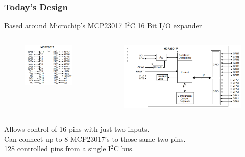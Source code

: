 \documentclass[t]{beamer}
\begin{document}
\begin{frame}
\frametitle{Today's Design}
Based around Microchip's MCP23017 I$^2$C 16 Bit I/O expander

\begin{columns}[c]
	\begin{figure}
		\includegraphics[width=1\linewidth]{mcp23071pinout.PNG}
	\end{figure}
	
	\begin{figure}
		\includegraphics[width=1\linewidth]{mcpFunctional.png}
	\end{figure}
\end{columns}
\vspace{7mm}
Allows control of 16 pins with just two inputs.\\
Can connect up to 8 MCP23017's to those same two pins.\\
128 controlled pins from a single I$^2$C bus.\\

\end{frame}
\end{document}
